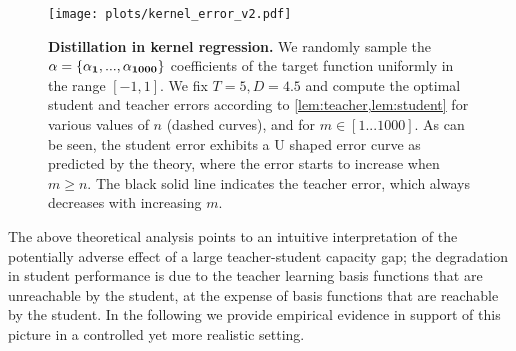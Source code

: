 \begin{figure}[h]
	\centering
	\texttt{[image: plots/kernel\_error\_v2.pdf]}
	\caption{\textbf{Distillation in kernel regression.} We randomly sample the $\bf{\alpha} = \{\alpha_1,...,\alpha_{1000}\}$ coefficients of the target function uniformly in the range $[-1,1]$. We fix $T = 5, D = 4.5$ and compute the optimal student and teacher errors according to \cref{lem:teacher,lem:student} for various values of $n$ (dashed curves), and for $m \in [1...1000]$. As can be seen, the student error exhibits a U shaped error curve as predicted by the theory, where the error starts to increase when $m\geq n$. The black solid line indicates the teacher error, which always decreases with increasing $m$.}
    \label{fig:kernel}
\end{figure}
The above theoretical analysis points to an intuitive interpretation of the potentially adverse effect of a large teacher-student capacity gap; the degradation in student performance is due to the teacher learning basis functions that are unreachable by the student, at the expense of basis functions that are reachable by the student. In the following we provide empirical evidence in support of this picture in a controlled yet more realistic setting.
